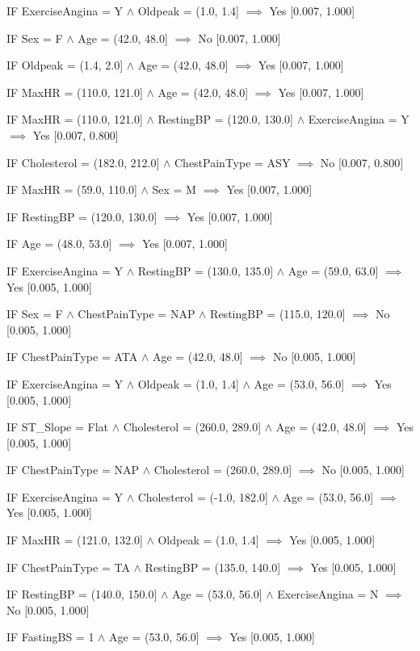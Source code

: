 IF ExerciseAngina = Y $\land$ Oldpeak = (1.0, 1.4] $\implies$ Yes [0.007, 1.000]

IF Sex = F $\land$ Age = (42.0, 48.0] $\implies$ No [0.007, 1.000]

IF Oldpeak = (1.4, 2.0] $\land$ Age = (42.0, 48.0] $\implies$ Yes [0.007, 1.000]

IF MaxHR = (110.0, 121.0] $\land$ Age = (42.0, 48.0] $\implies$ Yes [0.007, 1.000]

IF MaxHR = (110.0, 121.0] $\land$ RestingBP = (120.0, 130.0] $\land$ ExerciseAngina = Y $\implies$ Yes [0.007, 0.800]

IF Cholesterol = (182.0, 212.0] $\land$ ChestPainType = ASY $\implies$ No [0.007, 0.800]

IF MaxHR = (59.0, 110.0] $\land$ Sex = M $\implies$ Yes [0.007, 1.000]

IF RestingBP = (120.0, 130.0] $\implies$ Yes [0.007, 1.000]

IF Age = (48.0, 53.0] $\implies$ Yes [0.007, 1.000]

IF ExerciseAngina = Y $\land$ RestingBP = (130.0, 135.0] $\land$ Age = (59.0, 63.0] $\implies$ Yes [0.005, 1.000]

IF Sex = F $\land$ ChestPainType = NAP $\land$ RestingBP = (115.0, 120.0] $\implies$ No [0.005, 1.000]

IF ChestPainType = ATA $\land$ Age = (42.0, 48.0] $\implies$ No [0.005, 1.000]

IF ExerciseAngina = Y $\land$ Oldpeak = (1.0, 1.4] $\land$ Age = (53.0, 56.0] $\implies$ Yes [0.005, 1.000]

IF ST\_Slope = Flat $\land$ Cholesterol = (260.0, 289.0] $\land$ Age = (42.0, 48.0] $\implies$ Yes [0.005, 1.000]

IF ChestPainType = NAP $\land$ Cholesterol = (260.0, 289.0] $\implies$ No [0.005, 1.000]

IF ExerciseAngina = Y $\land$ Cholesterol = (-1.0, 182.0] $\land$ Age = (53.0, 56.0] $\implies$ Yes [0.005, 1.000]

IF MaxHR = (121.0, 132.0] $\land$ Oldpeak = (1.0, 1.4] $\implies$ Yes [0.005, 1.000]

IF ChestPainType = TA $\land$ RestingBP = (135.0, 140.0] $\implies$ Yes [0.005, 1.000]

IF RestingBP = (140.0, 150.0] $\land$ Age = (53.0, 56.0] $\land$ ExerciseAngina = N $\implies$ No [0.005, 1.000]

IF FastingBS = 1 $\land$ Age = (53.0, 56.0] $\implies$ Yes [0.005, 1.000]

